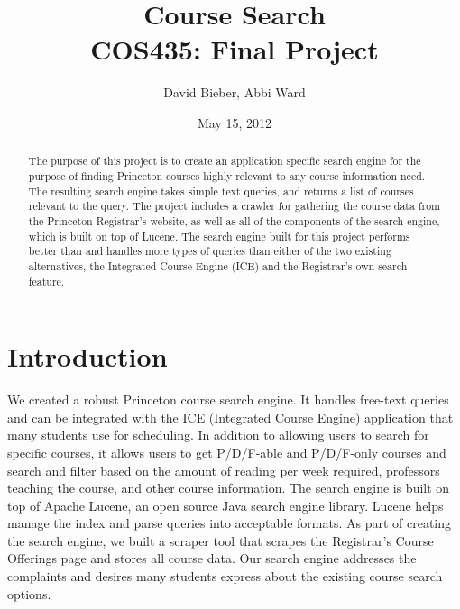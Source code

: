 \documentclass[12pt,letterpaper]{article}
\begin{document}
\title{Course Search \\ \large{COS435: Final Project}}
\author{David Bieber, Abbi Ward}
\date{May 15, 2012}

\null  %
\nointerlineskip  %
\vfill
\let\snewpage \newpage
\let\newpage \relax
\maketitle
\let \newpage \snewpage
\vfill 
\break %

\newpage

\begin{abstract}
The purpose of this project is to create an application specific search engine for the purpose of finding Princeton courses highly relevant to any course information need.
The resulting search engine takes simple text queries, and returns a list of courses relevant to the query. The project includes a crawler for gathering the course data from the Princeton Registrar's website, as well as all of the components of the search engine, which is built on top of Lucene.
The search engine built for this project performs better than and handles more types of queries than either of the two existing alternatives, the Integrated Course Engine (ICE) and the Registrar's own search feature.
\end{abstract}

\section{Introduction}
We created a robust Princeton course search engine. It handles free-text queries and can be integrated with the ICE (Integrated Course Engine) application that many students use for scheduling.
In addition to allowing users to search for specific courses, it allows users to get P/D/F-able and P/D/F-only courses and search and filter based on the amount of reading per week required, professors teaching the course, and other course information.
The search engine is built on top of Apache Lucene, an open source Java search engine library. Lucene helps manage the index and parse queries into acceptable formats.
As part of creating the search engine, we built a scraper tool that scrapes the Registrar's Course Offerings page and stores all course data.
Our search engine addresses the complaints and desires many students express about the existing course search options. 
\end{document}
